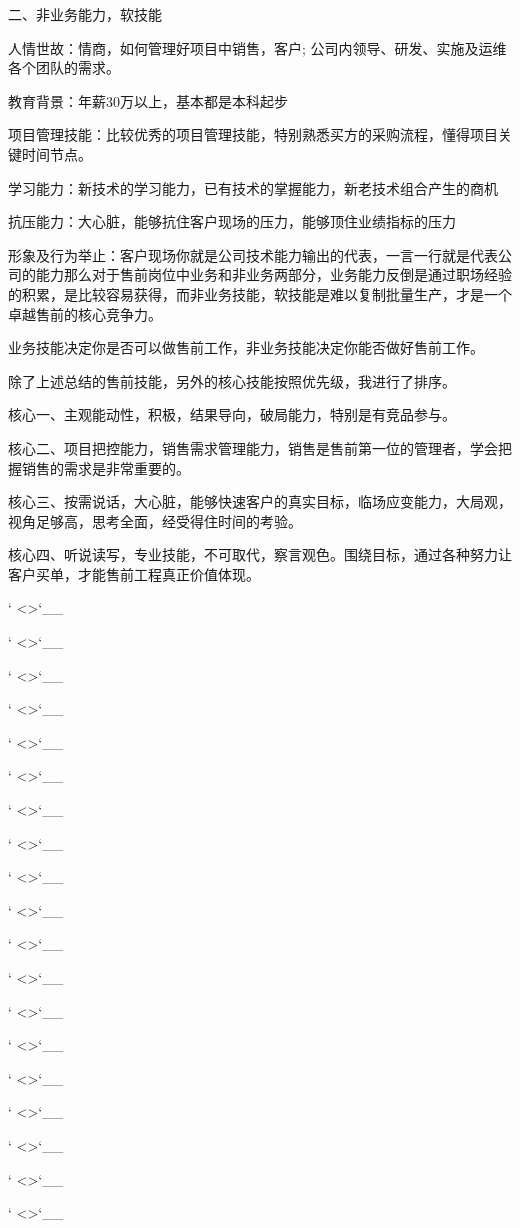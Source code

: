 \documentclass[letterpaper,12pt,english]{sphinxmanual}
\begin{document}
二、非业务能力，软技能

人情世故：情商，如何管理好项目中销售，客户; 公司内领导、研发、实施及运维各个团队的需求。

教育背景：年薪30万以上，基本都是本科起步

项目管理技能：比较优秀的项目管理技能，特别熟悉买方的采购流程，懂得项目关键时间节点。

学习能力：新技术的学习能力，已有技术的掌握能力，新老技术组合产生的商机

抗压能力：大心脏，能够抗住客户现场的压力，能够顶住业绩指标的压力

形象及行为举止：客户现场你就是公司技术能力输出的代表，一言一行就是代表公司的能力那么对于售前岗位中业务和非业务两部分，业务能力反倒是通过职场经验的积累，是比较容易获得，而非业务技能，软技能是难以复制批量生产，才是一个卓越售前的核心竞争力。

业务技能决定你是否可以做售前工作，非业务技能决定你能否做好售前工作。

除了上述总结的售前技能，另外的核心技能按照优先级，我进行了排序。

核心一、主观能动性，积极，结果导向，破局能力，特别是有竞品参与。

核心二、项目把控能力，销售需求管理能力，销售是售前第一位的管理者，学会把握销售的需求是非常重要的。

核心三、按需说话，大心脏，能够快速客户的真实目标，临场应变能力，大局观，视角足够高，思考全面，经受得住时间的考验。

核心四、听说读写，专业技能，不可取代，察言观色。围绕目标，通过各种努力让客户买单，才能售前工程真正价值体现。

` <>`\_\_

` <>`\_\_

` <>`\_\_

` <>`\_\_

` <>`\_\_

` <>`\_\_

` <>`\_\_

` <>`\_\_

` <>`\_\_

` <>`\_\_

` <>`\_\_

` <>`\_\_

` <>`\_\_

` <>`\_\_

` <>`\_\_

` <>`\_\_

` <>`\_\_

` <>`\_\_

` <>`\_\_
\end{document}
